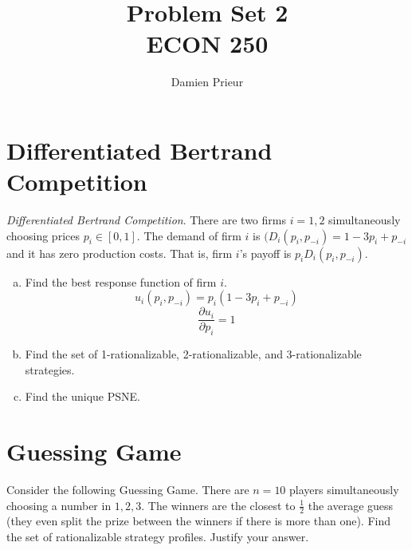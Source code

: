 \documentclass{article}
\author{Damien Prieur}
\title{Problem Set 2 \\ ECON 250}
\date{}
\begin{document}
\maketitle

\section{Differentiated Bertrand Competition}
\emph{Differentiated Bertrand Competition}.
There are two firms $i = 1, 2$ simultaneously choosing prices $p_{i} \in [0,1]$.
The demand of firm $i$ is $(D_{i}(p_{i},p_{-i})= 1-3p_{i} + p_{-i}$ and it has zero production costs.
That is, firm $i$'s payoff is $p_{i}D_{i}(p_{i},p_{-i})$.

\begin{enumerate}[(a)]

\item Find the best response function of firm $i$.
\newline
$$u_{i}(p_{i},p_{-i}) = p_{i} ( 1 - 3p_{i} + p_{-i})$$
$$\frac{\partial u_{i}}{\partial p_{i}} = 1$$

\item Find the set of 1-rationalizable, 2-rationalizable, and 3-rationalizable strategies.
\newline

\item Find the unique PSNE.
\newline

\end{enumerate}

\section{Guessing Game}
Consider the following Guessing Game.
There are $n = 10$ players simultaneously choosing a number in ${1,2,3}$.
The winners are the closest to $\frac{1}{2}$ the average guess (they even split the prize between the winners if there is more than one).
Find the set of rationalizable strategy profiles. Justify your answer.
\end{document}
